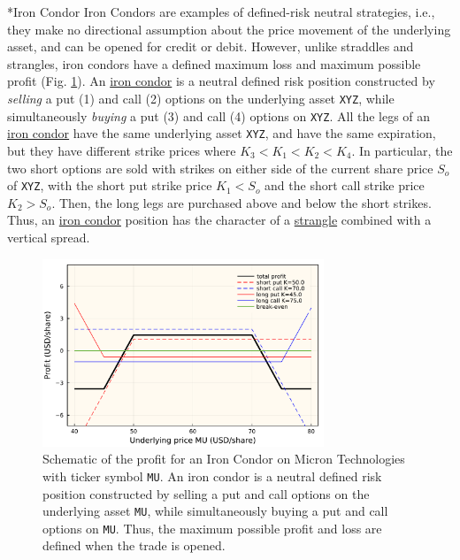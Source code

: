 \documentclass[11pt]{article}
\makeatletter
\theoremstyle{definition}
\renewcommand\subsubsection{\@startsection
	{subsubsection}{2}{0mm}
	{-0.05in}
	{-0.5\baselineskip}
	{\normalfont\normalsize\itshape\bfseries}}
\makeatother
\begin{document}
\subsubsection*{Iron Condor}
Iron Condors are examples of defined-risk neutral strategies, i.e., they make no directional assumption about the price movement of the underlying asset, 
and can be opened for credit or debit.
However, unlike straddles and strangles, iron condors have a defined maximum loss and maximum possible profit (Fig. \ref{fig:options-iron-condor-profit}).
An \href{https://www.investopedia.com/terms/i/ironcondor.asp}{iron condor} is a neutral defined risk position constructed 
by \textit{selling} a put (1) and call (2) options on the underlying asset \texttt{XYZ}, 
while simultaneously \textit{buying} a put (3) and call (4) options on \texttt{XYZ}. 
All the legs of an \href{https://www.investopedia.com/terms/i/ironcondor.asp}{iron condor} have the same underlying asset \texttt{XYZ}, 
and have the same expiration, but they have different strike prices where $K_{3}<K_{1}<K_{2}<K_{4}$. 
In particular, the two short options are sold with strikes on either side of the current share price $S_{o}$ of \texttt{XYZ}, 
with the short put strike price $K_{1}<S_{o}$ and the short call strike price $K_{2}>S_{o}$. 
Then, the long legs are purchased above and below the short strikes.  
Thus, an \href{https://www.investopedia.com/terms/i/ironcondor.asp}{iron condor} position has the character of a 
\href{https://www.investopedia.com/terms/s/strangle.asp}{strangle} combined with a vertical spread. 

\begin{figure}[h]
    \centering
    \includegraphics[width=0.75\textwidth]{./figs/Fig-MU-Profit-IronCondor.pdf}
    \caption{Schematic of the profit for an Iron Condor on Micron Technologies with ticker symbol \texttt{MU}.
	An iron condor is a neutral defined risk position constructed by selling a put and call options on the underlying asset \texttt{MU},
	while simultaneously buying a put and call options on \texttt{MU}. Thus, the maximum possible profit and loss are defined when the trade is opened.
	}\label{fig:options-iron-condor-profit}
\end{figure}
\end{document}
